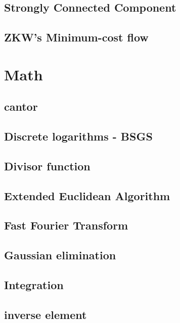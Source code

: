 \documentclass[a4paper,5pt,twocolumn,titlepage]{article}
\begin{document}
\subsection{Strongly Connected Component}

\subsection{ZKW's Minimum-cost flow}


\section{Math}
\subsection{cantor}

\subsection{Discrete logarithms - BSGS}

\subsection{Divisor function}

\subsection{Extended Euclidean Algorithm}

\subsection{Fast Fourier Transform}

\subsection{Gaussian elimination}

\subsection{Integration}

\subsection{inverse element}

\end{document}
